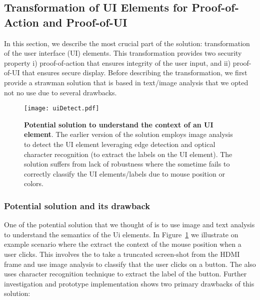 \subsection{Transformation of UI Elements for Proof-of-Action and Proof-of-UI}
\label{sec:systemDesign:transformation}


In this section, we describe the most crucial part of the \name solution: transformation of the user interface (UI) elements. This transformation provides two security property i) proof-of-action that ensures integrity of the user input, and ii) proof-of-UI that ensures secure display. Before describing the transformation, we first provide a strawman solution that is based in text/image analysis that we opted not no use due to several drawbacks.   

\begin{figure}[!htpb]
\centering
\texttt{[image: uiDetect.pdf]}
\caption{\textbf{Potential solution to understand the context of an UI element}. The earlier version of the \name solution employs image analysis to detect the UI element leveraging edge detection and optical character recognition (to extract the labels on the UI element). The solution suffers from lack of robustness where the \device sometime fails to correctly classify the UI elements/labels due to mouse position or colors.}
\label{fig:uiDetect}
\centering
\end{figure}

\subsubsection{Potential solution and its drawback} One of the potential solution that we thought of is to use image and text analysis to understand the semantics of the Ui elements. In Figure~\ref{fig:uiDetect} we illustrate on example scenario where the \device extract the context of the mouse position when a user clicks. This involves the \device to take a truncated screen-shot from the HDMI frame and use image analysis to classify that the user clicks on a button. The \device also uses character recognition technique to extract the label of the button. Further investigation and prototype implementation shows two primary drawbacks of this solution:


